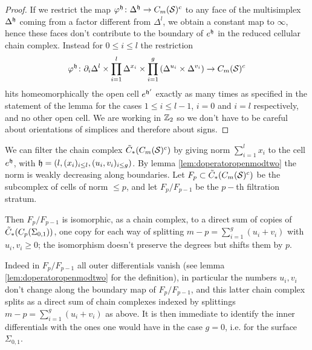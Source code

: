 \begin{proof}
 If we restrict the map $\varphi^{\mathfrak{h}}\colon\Delta^{\mathfrak{h}}\to C_m(\mathcal{S})^c$ to any face of the multisimplex
 $\Delta^{\mathfrak{h}}$ coming from a factor different from $\Delta^l$,
 we obtain a constant map to $\infty$, hence these faces don't contribute
 to the boundary of $e^{\mathfrak{h}}$ in the reduced cellular chain complex. Instead for $0\leq i\leq l$ the restriction
 \[
  \varphi^{\mathfrak{h}}\colon\partial_i\Delta^l\times\prod_{i=1}^l\Delta^{x_i}\times\prod_{i=1}^g\left(\Delta^{u_i}\times\Delta^{v_i}\right)\to C_m(\mathcal{S})^c
 \]
 hits homeomorphically the open cell $e^{\mathfrak{h}'}$
 exactly as many times as specified in the statement
 of the lemma for the cases $1\leq i\leq l-1$,
 $i=0$ and $i=l$ respectively, and no other open cell.
 We are working in $\mathbb{Z}_2$ so we don't have to be careful about orientations of simplices
 and therefore about signs.
\end{proof}

We can filter the chain complex $\tilde{C}_*(C_m(\mathcal{S})^c)$ by giving norm $\sum_{i=1}^lx_i$ to
the cell $e^{\mathfrak{h}}$, with $\mathfrak{h}=(l,(x_i)_{i\leq l},(u_i,v_i)_{i\leq g})$. By lemma \ref{lem:doperatoropenmodtwo}
the norm is weakly decreasing along boundaries. Let $F_p\subset\tilde{C}_*(C_m(\mathcal{S})^c)$ be the subcomplex of cells
of norm $\leq p$, and let $F_p/F_{p-1}$ be the $p-$th filtration stratum.

Then $F_p/F_{p-1}$ is isomorphic, as a chain complex, to a direct sum of copies of $\tilde{C}_*(C_p(\Sigma_{0,1}))$,
one copy for each way of splitting $m-p=\sum_{i=1}^g (u_i+v_i)$ with $u_i,v_i\geq 0$; the isomorphism
doesn't preserve the degrees but shifts them by $p$.

Indeed in $F_p/F_{p-1}$ all outer
differentials vanish (see lemma \ref{lem:doperatoropenmodtwo}
for the definition), in particular the numbers $u_i,v_i$
don't change along the boundary map of $F_p/F_{p-1}$, and this latter chain complex splits as a direct sum
of chain complexes indexed by splittings $m-p=\sum_{i=1}^g (u_i+v_i)$ as above.
It is then immediate to identify the inner differentials
with the ones one would have in the case $g=0$, i.e. for the surface $\Sigma_{0,1}$.

